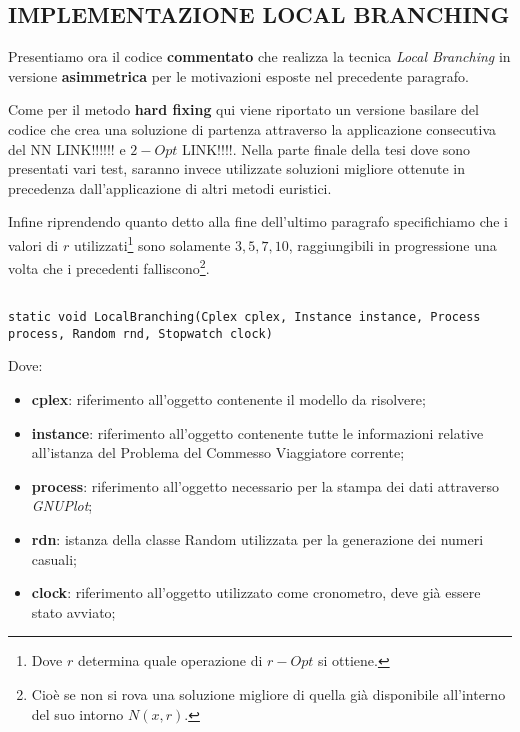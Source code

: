 \documentclass[11pt]{article}
\begin{document}
\subsection*{IMPLEMENTAZIONE LOCAL BRANCHING}

Presentiamo ora il codice \textbf{commentato} che realizza la tecnica \textit{Local Branching} in versione \textbf{asimmetrica} per le motivazioni esposte nel precedente paragrafo.

Come per il metodo \textbf{hard fixing} qui viene riportato un versione basilare del codice che crea una soluzione di partenza attraverso la applicazione consecutiva del NN LINK!!!!!! e $2-Opt$ LINK!!!!. Nella parte finale della tesi dove sono presentati vari test, saranno invece utilizzate soluzioni migliore ottenute in precedenza dall'applicazione di altri metodi euristici.

Infine riprendendo quanto detto alla fine dell'ultimo paragrafo specifichiamo che i valori di $r$ utilizzati\footnote{Dove $r$ determina quale operazione di $r-Opt$ si ottiene.} sono solamente ${3, 5, 7, 10}$, raggiungibili in progressione una volta che i precedenti falliscono\footnote{Cioè se non si rova una soluzione migliore di quella già disponibile all'interno del suo intorno $N(x,r)$.}.

\begin{lstlisting}

static void LocalBranching(Cplex cplex, Instance instance, Process process, Random rnd, Stopwatch clock)

\end{lstlisting}

Dove:

\begin{itemize}
    \item \textbf{cplex}: riferimento all'oggetto contenente il modello da risolvere;
    \item \textbf{instance}: riferimento all'oggetto contenente tutte le informazioni relative all'istanza del Problema del Commesso Viaggiatore corrente;
    \item \textbf{process}: riferimento all'oggetto necessario per la stampa dei dati attraverso \textit{GNUPlot};
    \item \textbf{rdn}: istanza della classe Random utilizzata per la generazione dei numeri casuali;
    \item \textbf{clock}: riferimento all'oggetto utilizzato come cronometro, deve già essere stato avviato;
\end{itemize}
\end{document}

